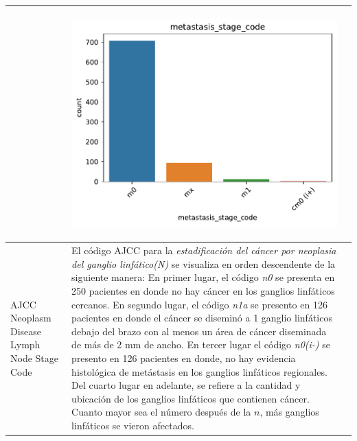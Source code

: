 \begin{table}[!htb]
\begin{threeparttable}
\begin{tabular}{p{2.5cm} p{7cm} p{6.5cm}}
			& \begin{center}\includegraphics[width=1\linewidth]{NOTEBOOK/IMAGENES_DESCRIPTIVAS/2_metastasis_stage_code}\end{center}
			\\ \hline
			AJCC Neoplasm Disease Lymph Node Stage Code
			& El código AJCC para la \textit{estadificación del cáncer por neoplasia del ganglio linfático(N)} se visualiza en orden descendente de la siguiente manera: En primer lugar, el código \textit{n0} se presenta en 250 pacientes en donde no hay cáncer en los ganglios linfáticos cercanos. En segundo lugar, el código \textit{n1a} se presento en 126 pacientes en donde el cáncer se diseminó a 1 ganglio linfáticos debajo del brazo con al menos un área de cáncer diseminada de más de 2 mm de ancho. En tercer lugar el código \textit{n0(i-)} se presento en 126 pacientes en donde, no hay evidencia histológica de metástasis en los ganglios linfáticos regionales. Del cuarto lugar en adelante, se refiere a la cantidad y ubicación de los ganglios linfáticos que contienen cáncer. Cuanto mayor sea el número después de la $n$, más ganglios linfáticos se vieron afectados.	
			

\end{tabular}
\end{threeparttable}
\end{table}

